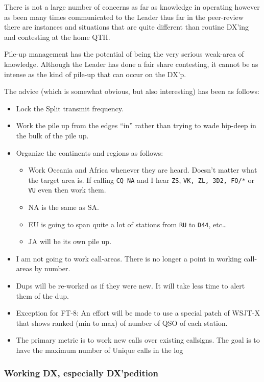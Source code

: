 \documentclass[11pt]{article}
\begin{document}
There is not a large number of concerns as far as knowledge in operating
however as been many times communicated to the Leader thus far in the peer-review
there are instances and situations that are quite different than routine DX'ing
and contesting at the home QTH.
\par
Pile-up management has the potential of being the very serious weak-area of 
knowledge.  Although the Leader has done a fair share contesting, it cannot
be as intense as the kind of pile-up that can occur on the DX'p.
\par
The advice (which is somewhat obvious, but also interesting) has been as follows:
\begin{itemize}
\item Lock the Split transmit frequency.
\item Work the pile up from the edges ``in'' rather than trying to wade hip-deep in the bulk of the pile up.
\item Organize the continents and regions as follows:
   \begin{itemize}
     \item Work Oceania and Africa whenever they are heard.  Doesn't matter what the
target area is.   If calling {\texttt{CQ NA}} and I hear {\texttt{ZS}},
{\texttt{VK, ZL, 3D2, FO/*}} or {\texttt{VU}} even then work them.
     \item NA is the same as SA.
     \item EU is going to span quite a lot of stations from {\texttt{RU}} to {\texttt{D44}},
etc\ldots
     \item JA will be its own pile up.
 
   \end{itemize}
\item I am not going to work call-areas.  There is no longer a point in working
call-areas by number.
\item Dups will be re-worked as if they were new.  It will take less time to alert
them of the dup.
\item Exception for FT-8:  An effort will be made to use a special patch of WSJT-X
that shows ranked (min to max) of number of QSO of each station.
\item The primary metric is to work new calls over existing callsigns.  The goal is
to have the maximum number of Unique calls in the log
\end{itemize}


\subsubsection{Working DX, especially DX'pedition}
\end{document}
